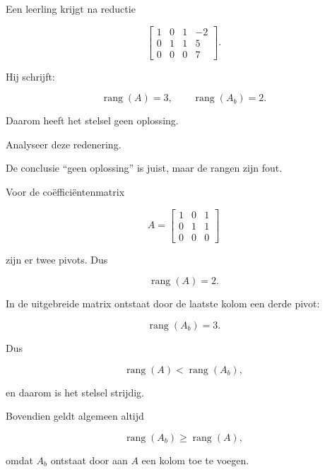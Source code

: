 \documentclass{ximera}
\begin{document}
\begin{oefening}{\oefU\ESS}

Een leerling krijgt na reductie

\[
\left[
\begin{array}{ccc|c}
1&0&1&-2\\
0&1&1&5\\
0&0&0&7
\end{array}
\right].
\]

Hij schrijft:

\[
\operatorname{rang}(A)=3,
\qquad
\operatorname{rang}(A_b)=2.
\]

Daarom heeft het stelsel geen oplossing.

Analyseer deze redenering.

\begin{oplossing}

De conclusie ``geen oplossing'' is juist, maar de rangen zijn fout.

Voor de coëfficiëntenmatrix

\[
A=
\begin{bmatrix}
1&0&1\\
0&1&1\\
0&0&0
\end{bmatrix}
\]

zijn er twee pivots. Dus

\[
\operatorname{rang}(A)=2.
\]

In de uitgebreide matrix ontstaat door de laatste kolom een derde pivot:

\[
\operatorname{rang}(A_b)=3.
\]

Dus

\[
\operatorname{rang}(A)
<
\operatorname{rang}(A_b),
\]

en daarom is het stelsel strijdig.

Bovendien geldt algemeen altijd

\[
\operatorname{rang}(A_b)
\geq
\operatorname{rang}(A),
\]

omdat \(A_b\) ontstaat door aan \(A\) een kolom toe te voegen.

\end{oplossing}

\end{oefening}



\end{document}
